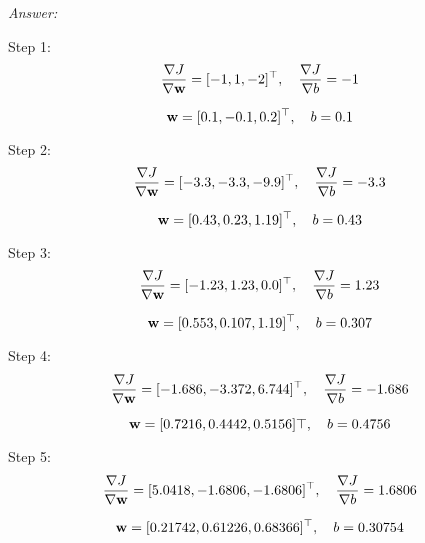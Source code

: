 \documentclass[12pt, fullpage,letterpaper]{article}
\begin{document}
\begin{enumerate}
\begin{enumerate}
	\textit{Answer:}

	Step 1: 
	\[
		\frac{\nabla J}{\nabla {\bf w}} = [-1, 1, -2]^\top,\quad
		\frac{\nabla J}{\nabla b} = -1 
	\]

	\[
		{\bf w} = [0.1, -0.1, 0.2]^\top,\quad
		b = 0.1
	\]

	Step 2: 
	\[
		\frac{\nabla J}{\nabla {\bf w}} = [-3.3, -3.3, -9.9]^\top,\quad
		\frac{\nabla J}{\nabla b} = -3.3 
	\]

	\[
		{\bf w} = [0.43, 0.23, 1.19]^\top,\quad
		b = 0.43
	\]

	Step 3: 
	\[
		\frac{\nabla J}{\nabla {\bf w}} = [-1.23, 1.23, 0.0]^\top,\quad
		\frac{\nabla J}{\nabla b} = 1.23 
	\]

	\[
		{\bf w} = [0.553, 0.107, 1.19]^\top,\quad
		b = 0.307
	\]

	Step 4: 
	\[
		\frac{\nabla J}{\nabla {\bf w}} = [-1.686, -3.372, 6.744]^\top,\quad
		\frac{\nabla J}{\nabla b} = -1.686 
	\]

	\[
		{\bf w} = [0.7216, 0.4442, 0.5156]\top,\quad
		b = 0.4756 
	\]

	Step 5: 
	\[
		\frac{\nabla J}{\nabla {\bf w}} = [5.0418, -1.6806, -1.6806]^\top,\quad
		\frac{\nabla J}{\nabla b} = 1.6806
	\]

	\[
		{\bf w} = [0.21742, 0.61226, 0.68366]^\top,\quad
		b = 0.30754 
	\]

\end{enumerate}
\end{enumerate}

\pagebreak
\end{document}
